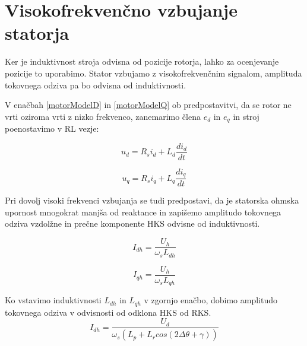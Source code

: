 \documentclass[a4paper,twoside,openright,12pt,slovene]{book}
\begin{document}
\section{Visokofrekvenčno vzbujanje statorja}


Ker je induktivnost stroja odvisna od pozicije rotorja, lahko za ocenjevanje pozicije to uporabimo. Stator vzbujamo z visokofrekvenčnim signalom, amplituda tokovnega odziva pa bo odvisna od
induktivnosti. 

V enačbah \ref{motorModelD} in \ref{motorModelQ} ob predpostavitvi, da se rotor ne vrti oziroma vrti z nizko frekvenco, zanemarimo člena $e_d$ in $e_q$ in stroj poenostavimo v RL vezje:

\begin{equation}
    u_d = R_si_d+L_d\frac{di_d}{dt}
\end{equation}

\begin{equation}
    u_q = R_si_q+L_q\frac{di_q}{dt}
\end{equation}


Pri dovolj visoki frekvenci vzbujanja se tudi predpostavi, da je statorska ohmska upornost mnogokrat manjša od reaktance in zapišemo amplitudo tokovnega odziva vzdolžne in prečne komponente HKS
odvisne od induktivnosti.

\begin{equation}
    I_{dh} = \frac{U_h}{\omega_sL_{dh}}
\end{equation}

\begin{equation}
    I_{qh} = \frac{U_h}{\omega_sL_{qh}}
\end{equation}

Ko vstavimo induktivnosti $L_{dh}$ in $L_{qh}$ v zgornjo enačbo, dobimo amplitudo tokovnega odziva v odvisnosti od odklona HKS od RKS.
\begin{equation} \label{tokovniOdzivEnacbaD}
    I_{dh} = \frac{U_d}{\omega_s (L_p + L_r cos(2\Delta\theta + \gamma))}
\end{equation}
\end{document}
